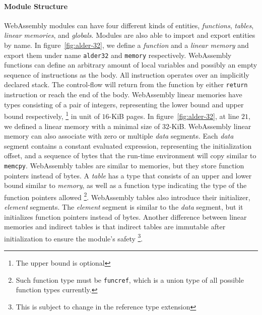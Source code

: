 \paragraph{Module Structure}
WebAssembly modules can have four different kinds of entities, \emph{functions}, \emph{tables}, \emph{linear memories}, and \emph{globals}. Modules are also able to import and export entities by name. In figure~\ref{fig:alder-32}, we define a \emph{function} and a \emph{linear memory} and export them under name \texttt{alder32} and \texttt{memory} respectively. WebAssembly functions can define an arbitrary amount of local variables and possibly an empty sequence of instructions as the body. All instruction operates over an implicitly declared stack. The control-flow will return from the function by either \texttt{return} instruction or reach the end of the body. WebAssembly linear memories have types consisting of a pair of integers, representing the lower bound and upper bound respectively, \footnote{The upper bound is optional} in unit of $16$-KiB pages. In figure~\ref{fig:alder-32}, at line $21$, we defined a linear memory with a minimal size of $32$-KiB. WebAssembly linear memory can also associate with zero or multiple \emph{data} segments. Each \emph{data} segment contains a constant evaluated expression, representing the initialization offset, and a sequence of bytes that the run-time environment will copy similar to \texttt{memcpy}. WebAssembly tables are similar to memories, but they store function pointers instead of bytes. A \emph{table} has a type that consists of an upper and lower bound similar to \emph{memory}, as well as a function type indicating the type of the function pointers allowed \footnote{Such function type must be \texttt{funcref}, which is a union type of all possible function types currently.}. WebAssembly tables also introduce their initializer, \emph{element} segments. The \emph{element} segment is similar to the \emph{data} segment, but it initializes function pointers instead of bytes. Another difference between linear memories and indirect tables is that indirect tables are immutable after initialization to ensure the module's safety \footnote{This is subject to change in the reference type extension}.

